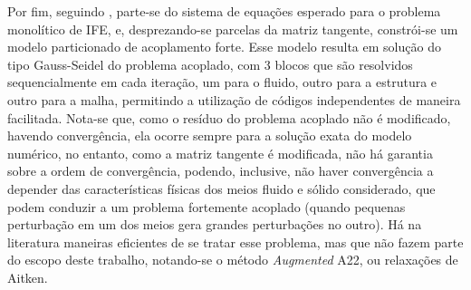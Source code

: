 
Por fim, seguindo , parte-se do sistema de equações esperado para o problema monolítico de IFE, e, desprezando-se parcelas da matriz tangente, constrói-se um modelo particionado de acoplamento forte. Esse modelo resulta em solução do tipo Gauss-Seidel do problema acoplado, com 3 blocos que são resolvidos sequencialmente em cada iteração, um para o fluido, outro para a estrutura e outro para a malha, permitindo a utilização de códigos independentes de maneira facilitada. Nota-se que, como o resíduo do problema acoplado não é modificado, havendo convergência, ela ocorre sempre para a solução exata do modelo numérico, no entanto, como a matriz tangente é modificada, não há garantia sobre a ordem de convergência, podendo, inclusive, não haver convergência a depender das características físicas dos meios fluido e sólido considerado, que podem conduzir a um problema fortemente acoplado (quando pequenas perturbação em um dos meios gera grandes perturbações no outro). Há na literatura maneiras eficientes de se tratar esse problema, mas que não fazem parte do escopo deste trabalho, notando-se o método \textit{Augmented} A22, ou relaxações de Aitken.

